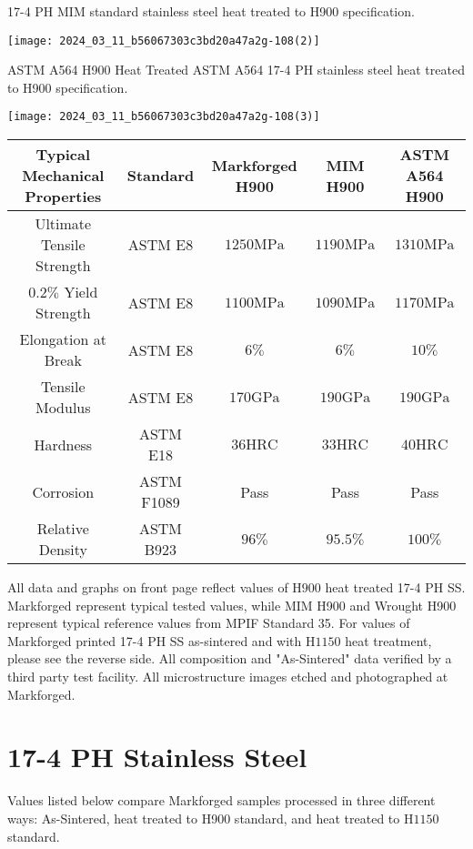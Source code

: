 \documentclass[10pt]{article}
\begin{document}
17-4 PH MIM standard stainless steel heat treated to H900 specification.

\begin{center}
\texttt{[image: 2024\_03\_11\_b56067303c3bd20a47a2g-108(2)]}
\end{center}

ASTM A564 H900 Heat Treated ASTM A564 17-4 PH stainless steel heat treated to H900 specification.

\begin{center}
\texttt{[image: 2024\_03\_11\_b56067303c3bd20a47a2g-108(3)]}
\end{center}

\begin{center}
\begin{tabular}{|c|c|c|c|c|}
\hline
Typical Mechanical Properties & Standard & Markforged H900 & MIM H900 & ASTM A564 H900 \\
\hline
Ultimate Tensile Strength & ASTM E8 & $1250 \mathrm{MPa}$ & $1190 \mathrm{MPa}$ & $1310 \mathrm{MPa}$ \\
\hline
$0.2 \%$ Yield Strength & ASTM E8 & $1100 \mathrm{MPa}$ & $1090 \mathrm{MPa}$ & $1170 \mathrm{MPa}$ \\
\hline
Elongation at Break & ASTM E8 & $6 \%$ & $6 \%$ & $10 \%$ \\
\hline
Tensile Modulus & ASTM E8 & $170 \mathrm{GPa}$ & $190 \mathrm{GPa}$ & $190 \mathrm{GPa}$ \\
\hline
Hardness & ASTM E18 & $36 \mathrm{HRC}$ & $33 \mathrm{HRC}$ & $40 \mathrm{HRC}$ \\
\hline
Corrosion & ASTM F1089 & Pass & Pass & Pass \\
\hline
Relative Density & ASTM B923 & $96 \%$ & $95.5 \%$ & $100 \%$ \\
\hline
\end{tabular}
\end{center}

All data and graphs on front page reflect values of $\mathrm{H} 900$ heat treated 17-4 PH SS. Markforged represent typical tested values, while MIM H900 and Wrought H900 represent typical reference values from MPIF Standard 35. For values of Markforged printed 17-4 PH SS as-sintered and with $\mathrm{H} 1150$ heat treatment, please see the reverse side. All composition and "As-Sintered" data verified by a third party test facility. All microstructure images etched and photographed at Markforged.

\section*{17-4 PH Stainless Steel}
Values listed below compare Markforged samples processed in three different ways: As-Sintered, heat treated to H900 standard, and heat treated to $\mathrm{H} 1150$ standard.
\end{document}
